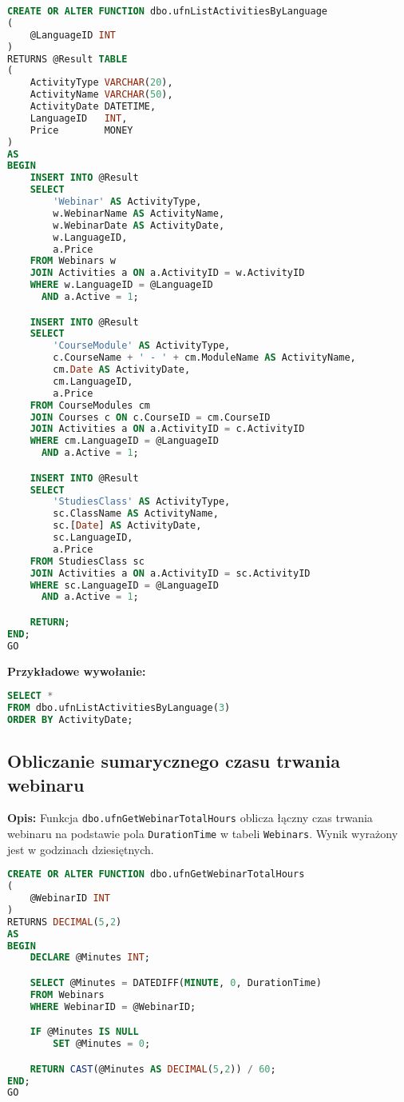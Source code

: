\documentclass[12pt]{article}
\begin{document}
 
\begin{lstlisting}[language=SQL]
CREATE OR ALTER FUNCTION dbo.ufnListActivitiesByLanguage
(
    @LanguageID INT
)
RETURNS @Result TABLE
(
    ActivityType VARCHAR(20),
    ActivityName VARCHAR(50),
    ActivityDate DATETIME,
    LanguageID   INT,
    Price        MONEY
)
AS
BEGIN
    INSERT INTO @Result
    SELECT 
        'Webinar' AS ActivityType,
        w.WebinarName AS ActivityName,
        w.WebinarDate AS ActivityDate,
        w.LanguageID,
        a.Price
    FROM Webinars w
    JOIN Activities a ON a.ActivityID = w.ActivityID
    WHERE w.LanguageID = @LanguageID
      AND a.Active = 1;

    INSERT INTO @Result
    SELECT 
        'CourseModule' AS ActivityType,
        c.CourseName + ' - ' + cm.ModuleName AS ActivityName,
        cm.Date AS ActivityDate,
        cm.LanguageID,
        a.Price
    FROM CourseModules cm
    JOIN Courses c ON c.CourseID = cm.CourseID
    JOIN Activities a ON a.ActivityID = c.ActivityID
    WHERE cm.LanguageID = @LanguageID
      AND a.Active = 1;

    INSERT INTO @Result
    SELECT 
        'StudiesClass' AS ActivityType,
        sc.ClassName AS ActivityName,
        sc.[Date] AS ActivityDate,
        sc.LanguageID,
        a.Price
    FROM StudiesClass sc
    JOIN Activities a ON a.ActivityID = sc.ActivityID
    WHERE sc.LanguageID = @LanguageID
      AND a.Active = 1;

    RETURN;
END;
GO
\end{lstlisting}

\textbf{Przykładowe wywołanie:}
\begin{lstlisting}[language=SQL]
SELECT *
FROM dbo.ufnListActivitiesByLanguage(3)
ORDER BY ActivityDate;
\end{lstlisting}

\subsection{Obliczanie sumarycznego czasu trwania webinaru}
\label{sec:webinar_total_hours}

\textbf{Opis:} Funkcja \texttt{dbo.ufnGetWebinarTotalHours} oblicza łączny czas trwania webinaru na podstawie pola \texttt{DurationTime} w tabeli \texttt{Webinars}. Wynik wyrażony jest w godzinach dziesiętnych.

 
\begin{lstlisting}[language=SQL]
CREATE OR ALTER FUNCTION dbo.ufnGetWebinarTotalHours
(
    @WebinarID INT
)
RETURNS DECIMAL(5,2)
AS
BEGIN
    DECLARE @Minutes INT;

    SELECT @Minutes = DATEDIFF(MINUTE, 0, DurationTime)
    FROM Webinars
    WHERE WebinarID = @WebinarID;

    IF @Minutes IS NULL
        SET @Minutes = 0;

    RETURN CAST(@Minutes AS DECIMAL(5,2)) / 60;
END;
GO
\end{lstlisting}
\end{document}
